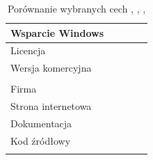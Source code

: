 \documentclass[thesis]{subfiles}
\begin{document}
\begin{table}[t]
{\begin{tabular}{l|l|l|l|l}
		Wsparcie Windows        & \cmark                          & \cmark                          & \ansiblewinpartialsupport        & \cmark                       \\\hline
		Licencja                & \apachegls                      & \apachegls                      & \gplgls                          & \apachegls                   \\\hline
		Wersja komercyjna       & \puppetenterprise               & \chefenterprise                 & \ansibleenterprise               & \saltenterprise              \\\hline
		\pricingtitle           & \puppetpricing                  & \chefpricing                    & \ansiblepricing                  & \saltpricing                 \\\hline
		Firma                   & \puppetcompany                  & \chefcompany                    & \redhatcompany                   & \saltcompany                 \\\hline
		Strona internetowa      & \puppetpage                     & \chefpage                       & \ansiblepage                     & \saltpage                    \\\hline
		Dokumentacja            & \puppetdocs                     & \chefdocs                       & \ansibledocs                     & \saltdocs                    \\\hline
		Kod źródłowy            & \puppetgithub                   & \chefgithub                     & \ansiblegithub                   & \saltgithub                  \\\hline
		\debcontest             & \puppetdebrank                  & \chefdebrank                    & \ansibledebrank                  & \saltdebrank %
	\end{tabular}}
	\caption{Porównanie wybranych cech \emph{\puppetref}, \emph{\chefref}, \emph{\ansibleref}, \emph{\saltref}}
	\label{tab:existing-solutions-comparison}
\end{table}
\end{document}
